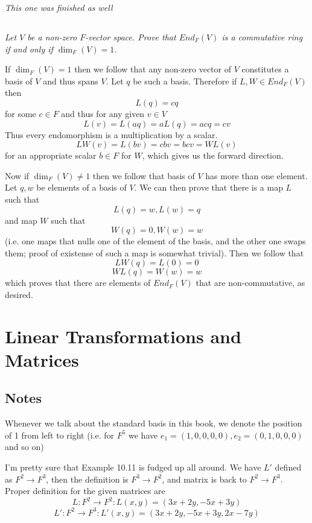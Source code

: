 \documentclass[11pt,oneside,titlepage]{book}
\begin{document}
\textit{This one was finished as well}

\subsection{}

\textit{Let $V$ be a non-zero $F$-vector space. Prove that $End_F(V)$
  is a commutative ring if and only if $\dim_F(V) = 1$.}

If $\dim_F(V) = 1$ then we follow that any non-zero vector of $V$
constitutes a basis of $V$ and thus spans $V$. Let $q$ be such a
basis. Therefore if $L, W \in End_F(V)$ then
$$L(q) = cq$$
for some $c \in F$ and thus for any given $v \in V$
$$L(v) = L(a q) = a L(q) = a cq = cv$$
Thus every endomorphism is a multiplication by a scalar.
$$L W (v) = L (b v) = cbv = bcv = W L (v)$$
for an appropriate scalar $b \in F$ for $W$, which gives us the
forward direction.

Now if $\dim_F(V) \neq 1$ then we follow that basis of $V$ has more
than one element. Let $q, w$ be elements of a basis of $V$.  We can
then prove that there is a map $L$ such that
$$L(q) = w, L(w) = q$$
and map $W$ such that
$$W(q) = 0, W(w) = w$$
(i.e. one maps that nulls one of the element of the basis, and the
other one swaps them; proof of existense of such a map is somewhat
trivial). Then we follow that
$$L W(q) = L(0) = 0$$
$$W L(q) = W(w) = w$$
which proves that there are elements of $End_F(V)$ that are
non-commutative, as desired.

\section{Linear Transformations and Matrices}

\subsection*{Notes}

Whenever we talk about the standard basis in this book, we denote
the position of 1 from left to right (i.e. for $F^5$ we have $e_1 =
(1, 0, 0, 0, 0), e_2 = (0, 1, 0, 0, 0)$ and so on)

I'm pretty sure that Example 10.11 is fudged up all around. We have
$L'$ defined as $F^2 \to F^3$, then the definition is $F^3 \to F^2$,
and matrix is back to $F^2 \to F^3$. Proper definition for the given
matrices are
$$L: F^2 \to F^2: L(x, y) = (3x + 2y, -5x + 3y)$$
$$L': F^2 \to F^3: L'(x, y) = (3x + 2y, -5x + 3y, 2x - 7y)$$
\end{document}
